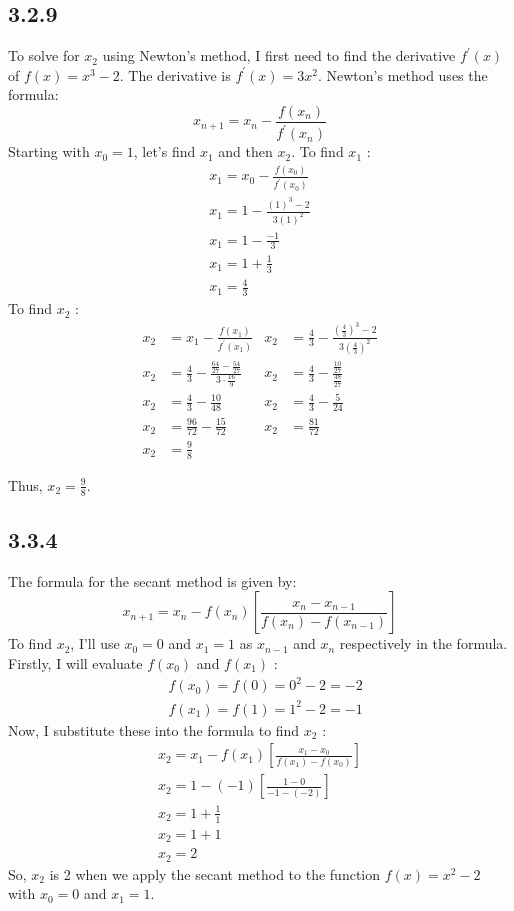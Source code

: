 \documentclass[manuscript,screen,review]{acmart}
\begin{document}
\subsection*{3.2.9}
To solve for $x_2$ using Newton's method, I first need to find the derivative $f^{\prime}(x)$ of $f(x)=x^3-2$. The derivative is $f^{\prime}(x)=3 x^2$.
Newton's method uses the formula:
$$
x_{n+1}=x_n-\frac{f\left(x_n\right)}{f^{\prime}\left(x_n\right)}
$$
Starting with $x_0=1$, let's find $x_1$ and then $x_2$.
To find $x_1$ :
$$
\begin{gathered}
x_1=x_0-\frac{f\left(x_0\right)}{f^{\prime}\left(x_0\right)} \\
x_1=1-\frac{(1)^3-2}{3(1)^2} \\
x_1=1-\frac{-1}{3} \\
x_1=1+\frac{1}{3} \\
x_1=\frac{4}{3}
\end{gathered}
$$
To find $x_2$ :
\begin{align*}
x_2 &= x_1-\frac{f\left(x_1\right)}{f^{\prime}\left(x_1\right)} &
x_2 &= \frac{4}{3}-\frac{\left(\frac{4}{3}\right)^3-2}{3\left(\frac{4}{3}\right)^2} \\
x_2 &= \frac{4}{3}-\frac{\frac{64}{27}-\frac{54}{27}}{3 \cdot \frac{16}{9}} &
x_2 &= \frac{4}{3}-\frac{\frac{10}{27}}{\frac{48}{27}} \\
x_2 &= \frac{4}{3}-\frac{10}{48} &
x_2 &= \frac{4}{3}-\frac{5}{24} \\
x_2 &= \frac{96}{72}-\frac{15}{72} &
x_2 &= \frac{81}{72} \\
x_2 &= \frac{9}{8}
\end{align*}

Thus, $x_2=\frac{9}{8}$.

\subsection*{3.3.4}
The formula for the secant method is given by:
$$
x_{n+1}=x_n-f\left(x_n\right)\left[\frac{x_n-x_{n-1}}{f\left(x_n\right)-f\left(x_{n-1}\right)}\right]
$$
To find $x_2$, I'll use $x_0=0$ and $x_1=1$ as $x_{n-1}$ and $x_n$ respectively in the formula.
Firstly, I  will evaluate $f\left(x_0\right)$ and $f\left(x_1\right)$ :
$$
\begin{aligned}
& f\left(x_0\right)=f(0)=0^2-2=-2 \\
& f\left(x_1\right)=f(1)=1^2-2=-1
\end{aligned}
$$
Now, I substitute these into the formula to find $x_2$ :
$$
\begin{gathered}
x_2=x_1-f\left(x_1\right)\left[\frac{x_1-x_0}{f\left(x_1\right)-f\left(x_0\right)}\right] \\
x_2=1-(-1)\left[\frac{1-0}{-1-(-2)}\right] \\
x_2=1+\frac{1}{1} \\
x_2=1+1 \\
x_2=2
\end{gathered}
$$
So, $x_2$ is 2 when we apply the secant method to the function $f(x)=x^2-2$ with $x_0=0$ and $x_1=1$.
\end{document}
